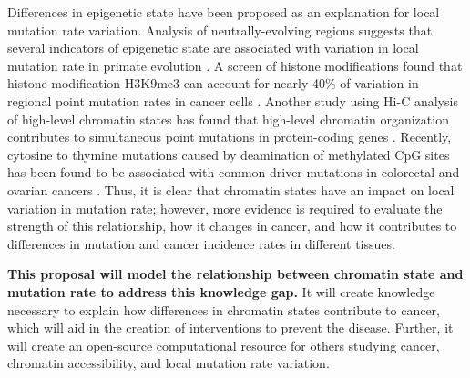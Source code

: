 Differences in epigenetic state have been proposed as an explanation for local mutation rate variation.
Analysis of neutrally-evolving regions suggests that several indicators of epigenetic state are associated with variation in local mutation rate in primate evolution \parencite{makova_effects_2015}.
A screen of histone modifications found that histone modification H3K9me3 can account for nearly 40\% of variation in regional point mutation rates in cancer cells \parencite{schuster-bockler_chromatin_2012}.
Another study using Hi-C analysis of high-level chromatin states has found that high-level chromatin organization contributes to simultaneous point mutations in protein-coding genes \parencite{shi_chromatin_2016}.
Recently, cytosine to thymine mutations caused by deamination of methylated CpG sites has been found to be associated with common driver mutations in colorectal and ovarian cancers \parencite{gold_somatic_2017}.
Thus, it is clear that chromatin states have an impact on local variation in mutation rate; however, more evidence is required to evaluate the strength of this relationship, how it changes in cancer, and how it contributes to differences in mutation and cancer incidence rates in different tissues.

\textbf{This proposal will model the relationship between chromatin state and mutation rate to address this knowledge gap.}
It will create knowledge necessary to explain how differences in chromatin states contribute to cancer, which will aid in the creation of interventions to prevent the disease. Further, it will create an open-source computational resource for others studying cancer, chromatin accessibility, and local mutation rate variation.




